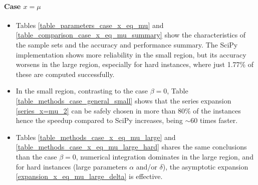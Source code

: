 \documentclass[10pt,a4paper,oneside]{article}
\numberwithin{equation}{section}
\begin{document}
\paragraph{Case $x = \mu$}
\begin{itemize}
\item Tables \ref{table_parameters_case_x_eq_mu} and \ref{table_comparison_case_x_eq_mu_summary} show the characteristics of the sample sets and the accuracy and performance summary. The SciPy implementation shows more reliability in the small region, but its accuracy worsens in the large region, especially for hard instances, where just 1.77\% of these are computed successfully.
\item In the small region, contrasting to the case $\beta = 0$, Table \ref{table_methods_case_general_small} shows that the series expansion \eqref{series_x=mu_2} can be safely chosen in more than $80\%$ of the instances hence the speedup compared to SciPy increases, being $\sim 60$ times faster.
\item Tables \ref{table_methods_case_x_eq_mu_large} and \ref{table_methods_case_x_eq_mu_large_hard} shares the same conclusions than the case $\beta = 0$, numerical integration dominates in the large region, and for hard instances (large parameters $\alpha$ and/or $\delta$), the asymptotic expansion \eqref{expansion_x_eq_mu_large_delta} is effective.
\end{itemize}
\end{document}
